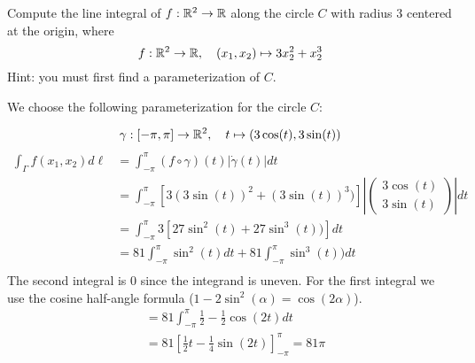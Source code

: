 \documentclass[11pt]{article}
\begin{document}
\begin{exercise}
    Compute the line integral of $f : \mathbb{R}^2 \rightarrow \mathbb{R}$ 
    along the circle $C$ with radius $3$ centered at the origin, where 
    \[
        f : \mathbb{R}^2 \to \mathbb{R}, \quad (x_1,x_2) \mapsto 3 x_2^2 + x_2^3
    \]
    Hint: you must first find a parameterization of $C$. 
\end{exercise}
\begin{solution} 
	We choose the following parameterization for the circle $C$:

$$
 \gamma : [-\pi,\pi] \rightarrow \mathbb{R}^2, \quad t \mapsto ( 3\cos(t), 3\sin(t) )
$$
\begin{align*}
\int_{\Gamma} f(x_1,x_2) d\ell &= \int_{-\pi}^{\pi} (f\circ \gamma)(t)|\dot{\gamma}(t)|dt\\
&= \int_{-\pi}^{\pi} \left[3(3\sin(t))^2+(3\sin(t))^3)\right]\left|\begin{pmatrix}3\cos(t)\\3\sin(t)\end{pmatrix}\right| dt\\
&= \int_{-\pi}^{\pi} 3\left[27\sin^2(t)+27\sin^3(t))\right]dt\\
&= 81\int_{-\pi}^{\pi} \sin^2(t)dt+ 81\int_{-\pi}^{\pi}\sin^3(t))dt\\
\end{align*}
The second integral is $0$ since the integrand is uneven. For the first integral we use the cosine half-angle formula ($1 - 2\sin^2(\alpha) = \cos(2\alpha)$).
\begin{align*}
&= 81\int_{-\pi}^{\pi} \frac{1}{2} - \frac{1}{2}\cos(2t)dt\\
&= 81 \left[ \frac{1}{2} t - \frac{1}{4}\sin(2t) \right]_{-\pi}^{\pi} = 81\pi
\end{align*}

\end{solution}

\end{document}
